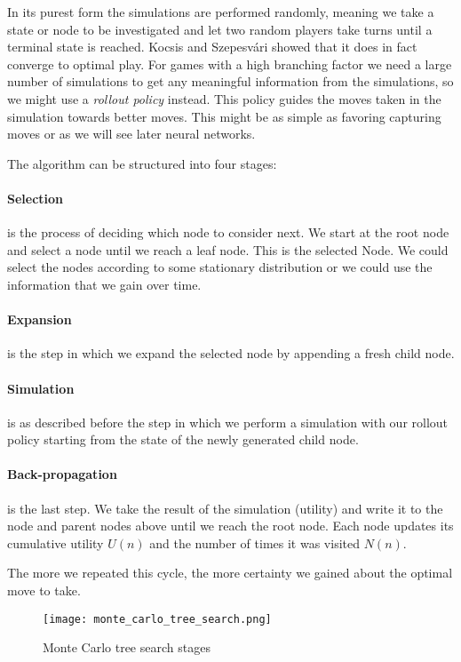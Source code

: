 In its purest form the simulations are performed randomly, meaning we take a state or node to be investigated and let two random players take turns until a terminal state is reached. Kocsis and Szepesvári \cite{kocsis_bandit_2006} showed that it does in fact converge to optimal play. For games with a high branching factor we need a large number of simulations to get any meaningful information from the simulations, so we might use a \textit{rollout policy} instead. This policy guides the moves taken in the simulation towards better moves. This might be as simple as favoring capturing moves or as we will see later neural networks.

The algorithm can be structured into four stages:

\paragraph{Selection} is the process of deciding which node to consider next. We start at the root node and select a node until we reach a leaf node. This is the selected Node. We could select the nodes according to some stationary distribution or we could use the information that we gain over time.

\paragraph{Expansion} is the step in which we expand the selected node by appending a fresh child node.

\paragraph{Simulation} is as described before the step in which we perform a simulation with our rollout policy starting from the state of the newly generated child node.

\paragraph{Back-propagation} is the last step. We take the result of the simulation (utility) and write it to the node and parent nodes above until we reach the root node. Each node updates its cumulative utility $U(n)$ and the number of times it was visited $N(n)$.

The more we repeated this cycle, the more certainty we gained about the optimal move to take.

\begin{figure}
    \centering
    \texttt{[image: monte\_carlo\_tree\_search.png]}
    \caption{Monte Carlo tree search stages \cite{noauthor_fig_nodate}}
    \label{monte_carlo_tree_search}
\end{figure}

